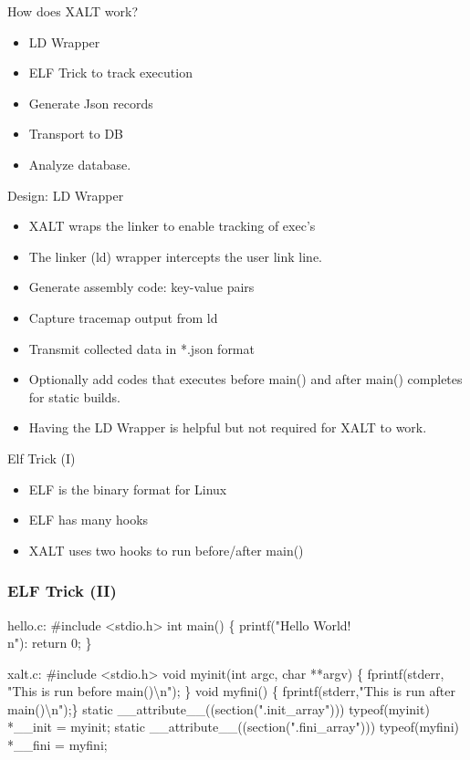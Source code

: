 \documentclass{beamer}
\begin{document}
\begin{frame}{How does XALT work?}
  \begin{itemize}
    \item LD Wrapper
    \item ELF Trick to track execution
    \item Generate Json records
    \item Transport to DB
    \item Analyze database.
  \end{itemize}
\end{frame}

\begin{frame}{Design: LD Wrapper}
  \begin{itemize}
    \item XALT wraps the linker to enable tracking of exec's
    \item The linker (ld) wrapper intercepts the user link line.
    \item Generate assembly code: key-value pairs
    \item Capture tracemap output from ld
    \item Transmit collected data in *.json format
    \item Optionally add codes that executes before main() and after
      main() completes for static builds.
    \item Having the LD Wrapper is helpful but not required for XALT
      to work.
  \end{itemize}
\end{frame}


\begin{frame}{Elf Trick (I)}
  \begin{itemize}
    \item ELF is the binary format for Linux
    \item ELF has many hooks
    \item XALT uses two hooks to run before/after main()
  \end{itemize}
\end{frame}

\begin{frame}[fragile]
    \frametitle{ELF Trick (II)}
 {\small
    \begin{semiverbatim}
{\color{blue}hello.c}:
#include <stdio.h>
int main() \{ printf("Hello World!\\n"): return 0; \}

{\color{blue}xalt.c}:
#include <stdio.h>
void myinit(int argc, char **argv)
\{ fprintf(stderr, "This is run before main()\textbackslash{}n"); \}
void myfini()
\{ fprintf(stderr,"This is run after main()\textbackslash{}n");\}
static \_\_attribute\_\_((section(".init_array")))
     typeof(myinit) *\_\_init = myinit;
static \_\_attribute\_\_((section(".fini_array")))
     typeof(myfini) *\_\_fini = myfini;
    \end{semiverbatim}
}
\end{frame}
\end{document}

